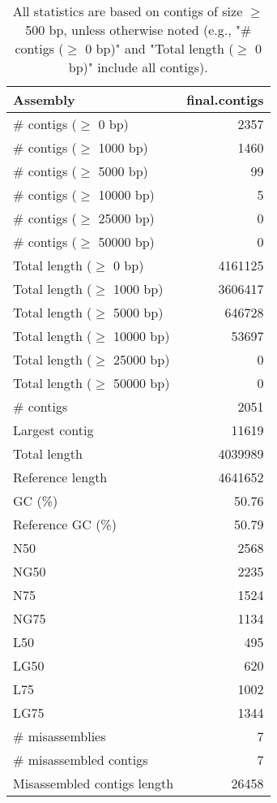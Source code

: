 \documentclass[12pt,a4paper]{article}
\begin{document}
\begin{table}[ht]
\begin{center}
\caption{All statistics are based on contigs of size $\geq$ 500 bp, unless otherwise noted (e.g., "\# contigs ($\geq$ 0 bp)" and "Total length ($\geq$ 0 bp)" include all contigs).}
\begin{tabular}{|l*{1}{|r}|}
\hline
Assembly & final.contigs \\ \hline
\# contigs ($\geq$ 0 bp) & 2357 \\ \hline
\# contigs ($\geq$ 1000 bp) & 1460 \\ \hline
\# contigs ($\geq$ 5000 bp) & 99 \\ \hline
\# contigs ($\geq$ 10000 bp) & 5 \\ \hline
\# contigs ($\geq$ 25000 bp) & 0 \\ \hline
\# contigs ($\geq$ 50000 bp) & 0 \\ \hline
Total length ($\geq$ 0 bp) & 4161125 \\ \hline
Total length ($\geq$ 1000 bp) & 3606417 \\ \hline
Total length ($\geq$ 5000 bp) & 646728 \\ \hline
Total length ($\geq$ 10000 bp) & 53697 \\ \hline
Total length ($\geq$ 25000 bp) & 0 \\ \hline
Total length ($\geq$ 50000 bp) & 0 \\ \hline
\# contigs & 2051 \\ \hline
Largest contig & 11619 \\ \hline
Total length & 4039989 \\ \hline
Reference length & 4641652 \\ \hline
GC (\%) & 50.76 \\ \hline
Reference GC (\%) & 50.79 \\ \hline
N50 & 2568 \\ \hline
NG50 & 2235 \\ \hline
N75 & 1524 \\ \hline
NG75 & 1134 \\ \hline
L50 & 495 \\ \hline
LG50 & 620 \\ \hline
L75 & 1002 \\ \hline
LG75 & 1344 \\ \hline
\# misassemblies & 7 \\ \hline
\# misassembled contigs & 7 \\ \hline
Misassembled contigs length & 26458 \\ \hline

\end{tabular}
\end{center}
\end{table}
\end{document}
